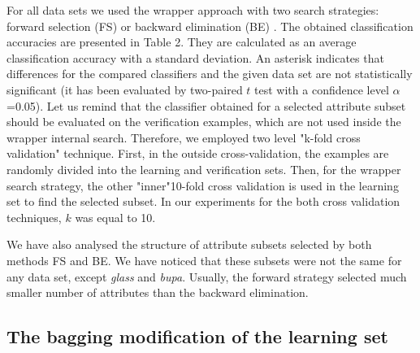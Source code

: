 \documentclass{elsart}
\begin{document}
For all data sets we used the wrapper approach with two search strategies:
forward selection (FS) or backward elimination (BE) . The obtained
classification accuracies are presented in Table 2. They are calculated as
an average classification accuracy with a standard deviation.  An asterisk
indicates that differences for the compared classifiers and the given data
set are not statistically significant (it has been evaluated by two-paired
$t$ test with a confidence level $\alpha$=0.05). Let us remind that the
classifier obtained for a selected attribute subset should be evaluated on
the verification examples, which are not used inside the wrapper internal
search. Therefore, we employed two level "k-fold cross validation"
technique. First, in the outside cross-validation, the examples are randomly
divided into the learning and verification sets. Then, for the wrapper
search strategy, the other "inner"10-fold cross validation is used in the
learning set to find the selected subset. In our experiments for the both
cross validation techniques, $k$ was equal to 10.

We have also analysed the structure of attribute subsets selected by both
methods FS and BE. We have noticed that these subsets were not the same for
any data set, except {\em glass} and {\em bupa}. Usually, the forward
strategy selected much smaller number of attributes than the backward
elimination.


\subsection{The bagging modification of the learning set}
\end{document}
